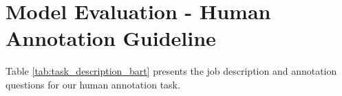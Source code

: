 
\section{Model Evaluation - Human Annotation Guideline}
\label{Model Evaluation - Human Annotation Guideline}

Table \ref{tab:task_description_bart} presents the job description and annotation questions for our human annotation task.

